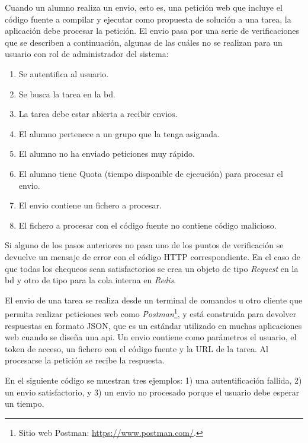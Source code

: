 \documentclass[11pt,spanish,listoffigures,listoftables]{tfgetsinf}
\begin{document}
Cuando un \Gls{alumno} realiza un \Gls{envio}, esto es, una petición web que incluye el código fuente a compilar y ejecutar como propuesta de solución a una \Gls{tarea}, la aplicación debe procesar la petición. El \Gls{envio} pasa por una serie de verificaciones que se describen a continuación, algunas de las cuáles no se realizan para un usuario con rol de \gls{administrador} del sistema:

\begin{enumerate}
	\item Se autentifica al usuario.
	\item Se busca la \Gls{tarea} en la \Gls{bd}.
	\item La \Gls{tarea} debe estar abierta a recibir \Gls{envio}s.
	\item El \Gls{alumno} pertenece a un \Gls{grupo} que la tenga asignada.
	\item El \Gls{alumno} no ha enviado peticiones muy rápido.
	\item El \Gls{alumno} tiene Quota (tiempo disponible de ejecución) para procesar el \Gls{envio}.
	\item El \Gls{envio} contiene un fichero a procesar.
	\item El fichero a procesar con el código fuente no contiene código malicioso.
\end{enumerate}

Si alguno de los pasos anteriores no pasa uno de los puntos de verificación se devuelve un mensaje de error con el código HTTP correspondiente. En el caso de que todas los chequeos sean satisfactorios se crea un objeto de tipo \textit{Request} en la \acrshort{bd} y otro de tipo  para la \Gls{cola} interna en \textit{Redis}.

El \Gls{envio} de una \Gls{tarea} se realiza desde un terminal de comandos u otro cliente que permita realizar peticiones web como \textit{Postman}\footnote{Sitio web Postman: \url{https://www.postman.com/}.}, y está construida para devolver respuestas en formato JSON, que es un estándar utilizado en muchas aplicaciones web cuando se diseña una \acrshort{api}. Un \Gls{envio} contiene como parámetros el usuario, el token de acceso, un fichero con el código fuente y la URL de la \Gls{tarea}. Al procesarse la petición se recibe la respuesta.

En el siguiente código se muestran tres ejemplos: 1) una autentificación fallida, 2) un \gls{envio} satisfactorio, y 3) un \Gls{envio} no procesado porque el usuario debe esperar un tiempo. \newline
\end{document}
